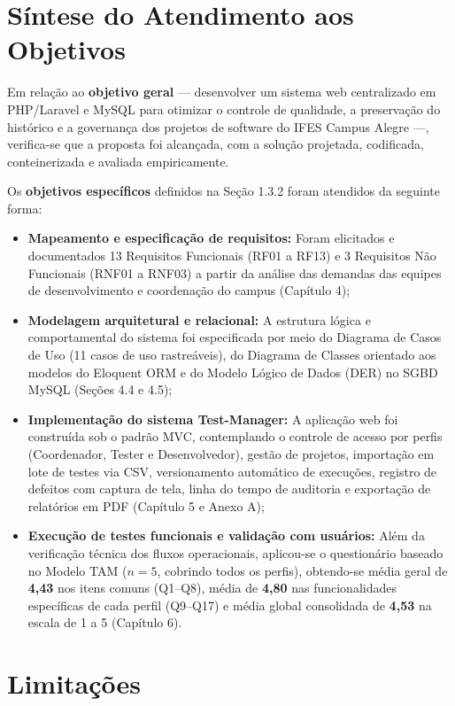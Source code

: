 \section{Síntese do Atendimento aos Objetivos}

Em relação ao \textbf{objetivo geral} --- desenvolver um sistema web centralizado em PHP/Laravel e MySQL para otimizar o controle de qualidade, a preservação do histórico e a governança dos projetos de software do IFES Campus Alegre ---, verifica-se que a proposta foi alcançada, com a solução projetada, codificada, conteinerizada e avaliada empiricamente.

Os \textbf{objetivos específicos} definidos na Seção 1.3.2 foram atendidos da seguinte forma:
\begin{itemize}
    \item \textbf{Mapeamento e especificação de requisitos:} Foram elicitados e documentados 13 Requisitos Funcionais (RF01 a RF13) e 3 Requisitos Não Funcionais (RNF01 a RNF03) a partir da análise das demandas das equipes de desenvolvimento e coordenação do campus (Capítulo 4);
    \item \textbf{Modelagem arquitetural e relacional:} A estrutura lógica e comportamental do sistema foi especificada por meio do Diagrama de Casos de Uso (11 casos de uso rastreáveis), do Diagrama de Classes orientado aos modelos do Eloquent ORM e do Modelo Lógico de Dados (DER) no SGBD MySQL (Seções 4.4 e 4.5);
    \item \textbf{Implementação do sistema Test-Manager:} A aplicação web foi construída sob o padrão MVC, contemplando o controle de acesso por perfis (Coordenador, Tester e Desenvolvedor), gestão de projetos, importação em lote de testes via CSV, versionamento automático de execuções, registro de defeitos com captura de tela, linha do tempo de auditoria e exportação de relatórios em PDF (Capítulo 5 e Anexo A);
    \item \textbf{Execução de testes funcionais e validação com usuários:} Além da verificação técnica dos fluxos operacionais, aplicou-se o questionário baseado no Modelo TAM ($n = 5$, cobrindo todos os perfis), obtendo-se média geral de \textbf{4,43} nos itens comuns (Q1--Q8), média de \textbf{4,80} nas funcionalidades específicas de cada perfil (Q9--Q17) e média global consolidada de \textbf{4,53} na escala de 1 a 5 (Capítulo 6).
\end{itemize}

\section{Limitações}

